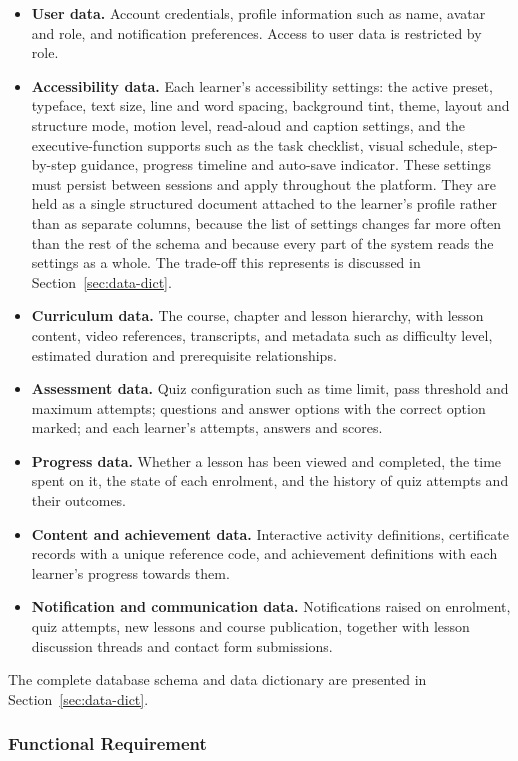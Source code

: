 \documentclass[12pt, oneside]{article} %
\begin{document}
\begin{itemize}
    \item \textbf{User data.} Account credentials, profile information such as name, avatar and role, and notification preferences. Access to user data is restricted by role.
    \item \textbf{Accessibility data.} Each learner's accessibility settings: the active preset, typeface, text size, line and word spacing, background tint, theme, layout and structure mode, motion level, read-aloud and caption settings, and the executive-function supports such as the task checklist, visual schedule, step-by-step guidance, progress timeline and auto-save indicator. These settings must persist between sessions and apply throughout the platform. They are held as a single structured document attached to the learner's profile rather than as separate columns, because the list of settings changes far more often than the rest of the schema and because every part of the system reads the settings as a whole. The trade-off this represents is discussed in Section~\ref{sec:data-dict}.
    \item \textbf{Curriculum data.} The course, chapter and lesson hierarchy, with lesson content, video references, transcripts, and metadata such as difficulty level, estimated duration and prerequisite relationships.
    \item \textbf{Assessment data.} Quiz configuration such as time limit, pass threshold and maximum attempts; questions and answer options with the correct option marked; and each learner's attempts, answers and scores.
    \item \textbf{Progress data.} Whether a lesson has been viewed and completed, the time spent on it, the state of each enrolment, and the history of quiz attempts and their outcomes.
    \item \textbf{Content and achievement data.} Interactive activity definitions, certificate records with a unique reference code, and achievement definitions with each learner's progress towards them.
    \item \textbf{Notification and communication data.} Notifications raised on enrolment, quiz attempts, new lessons and course publication, together with lesson discussion threads and contact form submissions.
\end{itemize}

The complete database schema and data dictionary are presented in Section~\ref{sec:data-dict}.

\subsubsection{Functional Requirement}
\end{document}
